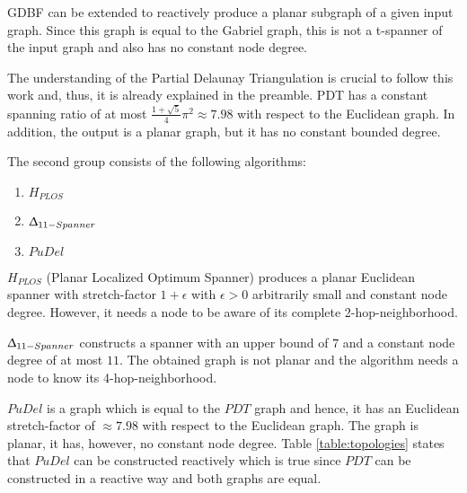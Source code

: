 GDBF can be extended to reactively produce a planar subgraph of a given input graph. 
Since this graph is equal to the Gabriel graph, this is not a t-spanner of the input graph and also has no constant node degree.

The understanding of the Partial Delaunay Triangulation is crucial to follow this work and, thus, it is already explained in the preamble.
PDT has a constant spanning ratio of at most $\frac{1+\sqrt{5}}{4}\pi^2 \approx 7.98 $ with respect to the Euclidean graph.
In addition, the output is a planar graph, but it has no constant bounded degree.


The second group consists of the following algorithms:
\begin{enumerate}
\item $H_{PLOS} $
\item $\Updelta _{11-Spanner} $
\item $PuDel $
\end{enumerate}

$H_{PLOS} $ (Planar Localized Optimum Spanner)\cite{Damian2010} produces a planar Euclidean spanner with stretch-factor $1+ \epsilon $ with $\epsilon >0 $ arbitrarily small and constant node degree.
However, it needs a node to be aware of its complete 2-hop-neighborhood.

$\Updelta _{11-Spanner} $ \cite{Kanj2012} constructs a spanner with an upper bound of $7 $ and a constant node degree of at most $11 $.
The obtained graph is not planar and the algorithm needs a node to know its 4-hop-neighborhood.

$PuDel $ \cite{Xu2011} is a graph which is equal to the $PDT $ graph \cite{Neumann2012} and hence, it has an Euclidean stretch-factor of $\approx 7.98 $ with respect to the Euclidean graph.
The graph is planar, it has, however, no constant node degree. 
Table \ref{table:topologies} states that $PuDel $ can be constructed reactively which is true since $PDT $ can be constructed in a reactive way and both graphs are equal.






